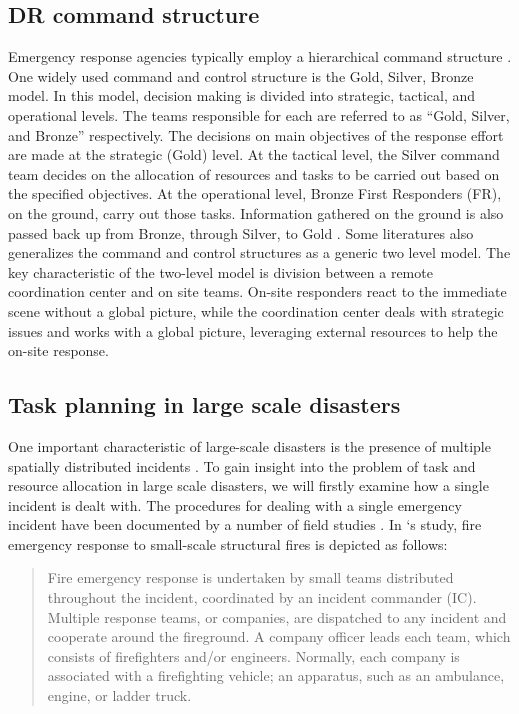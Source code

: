 \subsection{DR command structure}\label{sec:lrstructure}
Emergency response agencies typically employ a hierarchical command structure \citep{Ramchurn2015}. One widely used command and control structure is the Gold, Silver, Bronze model. In this model, decision making is divided into strategic, tactical, and operational levels. The teams responsible for each are referred to as ``Gold, Silver, and Bronze'' respectively. The decisions on main objectives of the response effort are made at the strategic (Gold) level. At the tactical level, the Silver command team decides on the allocation of resources and tasks to be carried out  based on the specified objectives. At the operational level, Bronze First Responders (FR), on the ground, carry out those tasks. Information gathered on the ground is also passed back up from Bronze, through Silver, to Gold \citep{Ramchurn2015}. Some literatures \citep{Chen2005,Chen2008} also generalizes the command and control structures as a generic two level model. The key characteristic of the two-level model is division between a remote coordination center and on site teams.  On-site responders react to the immediate scene without a global picture, while the coordination center deals with strategic issues and works with a global picture, leveraging external resources to help the on-site response. \\


\subsection{Task planning in large scale disasters} \label{sec:LRtaskplanning}
One important characteristic of large-scale disasters is the presence of multiple spatially distributed incidents \citep{Chen2005}. To gain insight into the problem of task and resource allocation in large scale disasters, we will firstly examine how a single incident is dealt with. The procedures for dealing with a single emergency incident have been documented by a number of field studies \citep{Comfort2004,Dawes2004,Petrescu-prahova2005}. In \cite{Toups2011}`s study, fire emergency response to small-scale structural fires is depicted as follows: 

\begin{quote}
Fire emergency response is undertaken by small teams distributed throughout the incident, coordinated by an incident commander (IC). Multiple response teams, or companies, are dispatched to any incident and cooperate around the fireground. A company officer leads each team, which consists of firefighters and/or engineers. Normally, each company is associated with a firefighting vehicle; an apparatus, such as an ambulance, engine, or ladder truck.\\
\end{quote}

